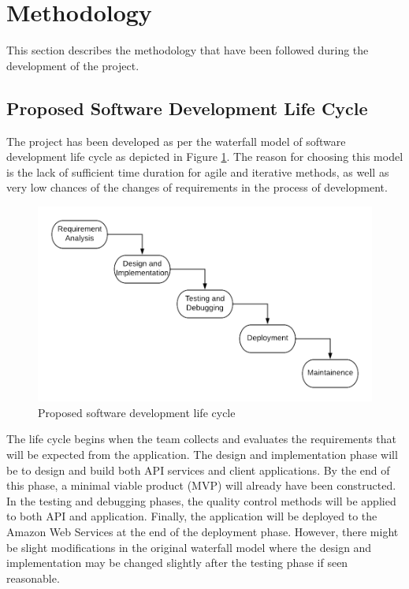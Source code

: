 \documentclass[12pt, a4paper, oneside]{article}
\begin{document}
\break
\section{Methodology}
This section describes the methodology that have been followed during the development of the project.

\subsection{Proposed Software Development Life Cycle}
The project has been developed as per the waterfall model of software development life cycle as depicted in Figure \ref{fig:sdlc}. The reason for choosing this model is the lack of sufficient time duration for agile and iterative methods, as well as very low chances of the changes of requirements in the process of development. 

\begin{figure}[h]
	\includegraphics[width=\linewidth]{sdlc}
	\centering
	\caption{Proposed software development life cycle}
	\label{fig:sdlc}
\end{figure}

The life cycle begins when the team collects and evaluates the requirements that will be expected from the application. The design and implementation phase will be to design and build both API services and client applications. By the end of this phase, a minimal viable product (MVP) will already have been constructed. In the testing and debugging phases, the quality control methods will be applied to both API and application. Finally, the application will be deployed to the Amazon Web Services at the end of the deployment phase. However, there might be slight modifications in the original waterfall model where the design and implementation may be changed slightly after the testing phase if seen reasonable.
\end{document}
